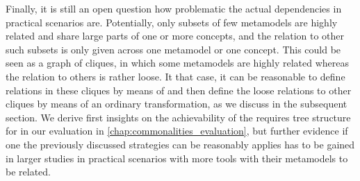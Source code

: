 Finally, it is still an open question how problematic the actual dependencies in practical scenarios are.
Potentially, only subsets of few metamodels are highly related and share large parts of one or more concepts, and the relation to other such subsets is only given across one metamodel or one concept.
This could be seen as a graph of cliques, in which some metamodels are highly related whereas the relation to others is rather loose.
It that case, it can be reasonable to define relations in these cliques by means of \commonalities and then define the loose relations to other cliques by means of an ordinary transformation, as we discuss in the subsequent section.
We derive first insights on the achievability of the requires tree structure for \commonalities in our evaluation in \autoref{chap:commonalities_evaluation}, but further evidence if one the previously discussed strategies can be reasonably applies has to be gained in larger studies in practical scenarios with more tools with their metamodels to be related.



